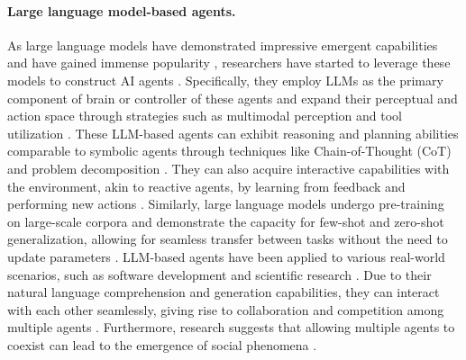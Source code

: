 \documentclass{article}
\begin{document}
\paragraph{Large language model-based agents.}
As large language models have demonstrated impressive emergent capabilities and have gained immense popularity \cite{DBLP:conf/nips/Ouyang0JAWMZASR22,DBLP:journals/corr/abs-2303-08774,DBLP:journals/tmlr/WeiTBRZBYBZMCHVLDF22,DBLP:conf/nips/BrownMRSKDNSSAA20}, researchers have started to leverage these models to construct AI agents \cite{DBLP:journals/corr/abs-2304-03442,DBLP:journals/corr/abs-2305-16960,DBLP:journals/corr/abs-2309-02427,DBLP:journals/corr/abs-2308-11432}. Specifically, they employ LLMs as the primary component of brain or controller of these agents and expand their perceptual and action space through strategies such as multimodal perception and tool utilization \cite{DBLP:journals/corr/abs-2112-09332,DBLP:conf/iclr/YaoZYDSN023,DBLP:journals/corr/abs-2302-04761,DBLP:journals/corr/abs-2304-09842,DBLP:journals/corr/abs-2304-08354}.
These LLM-based agents can exhibit reasoning and planning abilities comparable to symbolic agents through techniques like Chain-of-Thought (CoT) and problem decomposition \cite{DBLP:conf/nips/Wei0SBIXCLZ22,DBLP:conf/nips/KojimaGRMI22,DBLP:conf/iclr/0002WSLCNCZ23,DBLP:conf/iclr/ZhouSHWS0SCBLC23,DBLP:journals/corr/abs-2305-14497,shinn2023reflexion,DBLP:journals/corr/abs-2212-04088}. They can also acquire interactive capabilities with the environment, akin to reactive agents, by learning from feedback and performing new actions \cite{DBLP:conf/acl/AkyurekAKCWT23,DBLP:journals/corr/abs-2302-12813,liu2023languages}. 
Similarly, large language models undergo pre-training on large-scale corpora and demonstrate the capacity for few-shot and zero-shot generalization, allowing for seamless transfer between tasks without the need to update parameters \cite{DBLP:conf/nips/BrownMRSKDNSSAA20,DBLP:conf/iclr/WeiBZGYLDDL22,DBLP:conf/iclr/SanhWRBSACSRDBX22,DBLP:journals/corr/abs-2210-11416}.
LLM-based agents have been applied to various real-world scenarios, such as software development \cite{DBLP:journals/corr/abs-2303-17760,DBLP:journals/corr/abs-2307-07924} and scientific research \cite{DBLP:journals/corr/abs-2304-05332}.
Due to their natural language comprehension and generation capabilities, they can interact with each other seamlessly, giving rise to collaboration and competition among multiple agents \cite{DBLP:journals/corr/abs-2303-17760,DBLP:journals/corr/abs-2307-07924,DBLP:journals/corr/abs-2305-14325,DBLP:journals/corr/abs-2305-19118}. Furthermore, research suggests that allowing multiple agents to coexist can lead to the emergence of social phenomena \cite{DBLP:journals/corr/abs-2304-03442}.
\end{document}
